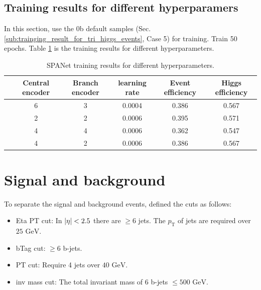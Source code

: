 \documentclass[12pt]{article}
\begin{document}
	\subsection{Training results for different hyperparamers}%
	\label{sub:training_results_for_different_hyperparamers}
		In this section, use the 0b default samples (Sec.\ref{sub:trainging_result_for_tri_higgs_events}, Case 5) for training. Train 50 epochs. Table \ref{tab:SPANet_hp_50ep} is the training results for different hyperparameters.
		
		\begin{table}[htpb]
			\centering
			\caption{SPANet training results for different hyperparameters.}
			\label{tab:SPANet_hp_50ep}
			\begin{tabular}{cccc|cc}
			 & Central encoder & Branch encoder & learning rate & Event efficiency & Higgs efficiency \\
			 \hline
			 &    6             &     3           &  0.0004             &   0.386               &    0.567              \\
			 &    2             &     2           &  0.0006             &   0.395               &    0.571              \\
			 &    4             &     4           &  0.0006             &   0.362               &    0.547             \\
			 &    4             &     2           &  0.0006             &   0.386               &    0.567             
			\end{tabular}
		\end{table}

\section{Signal and background}%
\label{sec:signal_and_background}
	To separate the signal and background events, defined the cuts as follows:
	\begin{itemize}
		\item Eta PT cut: In $\abs{\eta} < 2.5$ there are $\ge 6$ jets. The $p_\text{T}$ of jets are required over $25 \text{ GeV}$.
		\item bTag cut: $\ge 6$ b-jets.
		\item PT cut: Require 4 jets over $40 \text{ GeV}$.
		\item inv mass cut: The total invariant mass of 6 b-jets $\le 500 \text{ GeV}$.
	\end{itemize}
\end{document}
